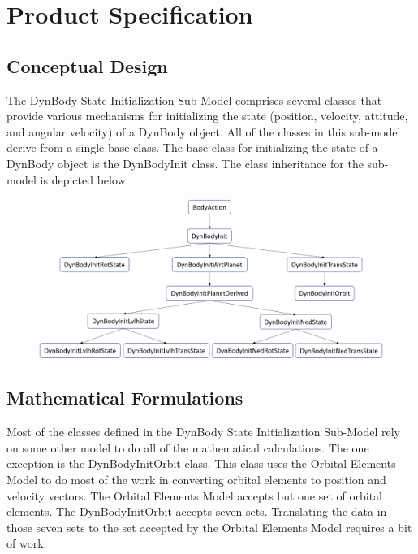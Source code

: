 %

\chapter{Product Specification}\label{ch:\modelpartid:spec}

\section{Conceptual Design}

The DynBody State Initialization Sub-Model comprises several classes that
provide various mechanisms for initializing the state
(position, velocity, attitude, and angular velocity) of
a DynBody object. All of the classes in this sub-model derive from
a single base class. The base class for initializing the state of a DynBody
object is the DynBodyInit class. The class inheritance for the sub-model
is depicted below.

\begin{figure}[H]
\begin{center}
\includegraphics[width=\textwidth] {fig/fig1.png}
\end{center}
\end{figure}

\section{Mathematical Formulations}
Most of the classes defined in the DynBody State Initialization Sub-Model
rely on some other model to do all of the mathematical calculations.
The one exception is the DynBodyInitOrbit class. This class uses the
Orbital Elements Model to do most of the work in converting orbital elements
to position and velocity vectors. The Orbital Elements Model accepts but
one set of orbital elements. The DynBodyInitOrbit accepts seven sets.
Translating the data in those seven sets to the set accepted by the
Orbital Elements Model requires a bit of work\cite{Vallado}:

